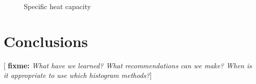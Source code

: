\documentclass[11pt]{article}
\newcommand{\red}[1]{{\bf \color{red} #1}}
\newcommand{\fixme}[1]{[\red{fixme:} \emph{#1}]}
\begin{document}
\begin{figure}[H]
  \centering
  \caption[Specific heat capacity]{Specific heat capacity}
  \label{fig:heat_capacity}
\end{figure}


\section{Conclusions}
\label{sec:conclusions}

\fixme{What have we learned? What recommendations can we make? When is
  it appropriate to use which histogram methods?}


\nocite{*} 
\end{document}
